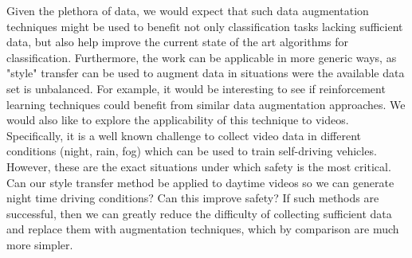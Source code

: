 \documentclass[10pt,twocolumn,letterpaper]{article}
\begin{document}
Given the plethora of data, we would expect that such data augmentation techniques might be used to benefit not only classification tasks lacking sufficient data, but also help improve the current state of the art algorithms for classification. Furthermore, the work can be applicable in more generic ways, as "style" transfer can be used to augment data in situations were the available data set is unbalanced. For example, it would be interesting to see if reinforcement learning techniques could benefit from similar data augmentation approaches. We would also like to explore the applicability of this technique to videos. Specifically, it is a well known challenge to collect video data in different conditions (night, rain, fog) which can be used to train self-driving vehicles. However, these are the exact situations under which safety is the most critical. Can our style transfer method be applied to daytime videos so we can generate night time driving conditions? Can this improve safety? If such methods are successful, then we can greatly reduce the difficulty of collecting sufficient data and replace them with augmentation techniques, which by comparison are much more simpler. 


{\small


}
\end{document}
